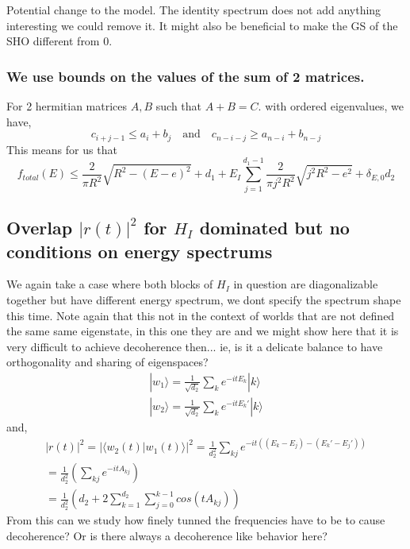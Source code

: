 \documentclass{article}
\begin{document}
Potential change to the model. The identity spectrum does not add anything interesting we could remove it. It might also be beneficial to make the GS of the SHO different from 0. 

\subsubsection{We use bounds on the values of the sum of 2 matrices.}

For 2 hermitian matrices $A,B$ such that $A+B=C$. with ordered eigenvalues, we have,
\begin{equation}
    c_{i+j-1}\leq a_i+b_j\quad\text{and}\quad c_{n-i-j}\geq a_{n-i}+b_{n-j}
\end{equation}
This means for us that
\begin{equation}
    f_{total}(E)\leq \frac{2}{\pi R^2}\sqrt{R^2-(E-e)^2} + d_1 + E_I\sum^{d_1-1}_{j=1}\frac{2}{\pi j^2 R^2}\sqrt{j^2R^2-e^2} +\delta_{E,0}d_2
\end{equation}

\subsection{Overlap $|r(t)|^2$ for $H_I$ dominated but no conditions on energy spectrums}
We again take a case where both blocks of $H_I$ in question are diagonalizable together but have different energy spectrum, we dont specify the spectrum shape this time. Note again that this not in the context of worlds that are not defined the same same eigenstate, in this one they are and we might show here that it is very difficult to achieve decoherence then... ie, is it a delicate balance to have orthogonality and sharing of eigenspaces? 
\begin{align}
    |w_1\rangle = \frac{1}{\sqrt{d_2}}\sum_ke^{-itE_k}|k\rangle\\
    |w_2\rangle = \frac{1}{\sqrt{d_2}}\sum_ke^{-itE_k'}|k\rangle
\end{align}
and,
\begin{align}
    |r(t)|^2=|\langle w_2(t)|w_1(t)\rangle|^2 = \frac{1}{d_2^2}\sum_{kj}e^{-it((E_k-E_j)-(E_k'-E_j'))}\\
    =\frac{1}{d_2^2}(\sum_{kj}e^{-itA_{kj}})\\
    =\frac{1}{d_2^2}(d_2+2\sum^{d_2}_{k=1}\sum^{k-1}_{j=0}cos(tA_{kj}))
\end{align}
From this can we study how finely tunned the frequencies have to be to cause decoherence? Or is there always a decoherence like behavior here? 
\end{document}
